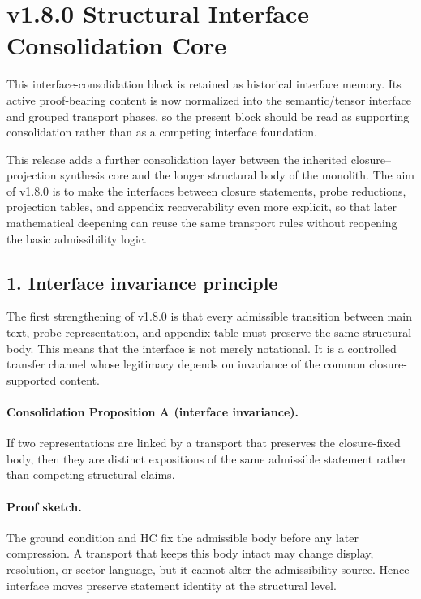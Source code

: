 \section*{v1.8.0 Structural Interface Consolidation Core}

\begin{remark}
\label{rem:normalization-note-v180}
This interface-consolidation block is retained as historical interface memory. Its active proof-bearing content is now normalized into the semantic/tensor interface and grouped transport phases, so the present block should be read as supporting consolidation rather than as a competing interface foundation.
\end{remark}

This release adds a further consolidation layer between the inherited closure--projection
synthesis core and the longer structural body of the monolith. The aim of
v1.8.0 is to make the interfaces between closure statements, probe reductions,
projection tables, and appendix recoverability even more explicit, so that later
mathematical deepening can reuse the same transport rules without reopening the
basic admissibility logic.

\subsection*{1. Interface invariance principle}
The first strengthening of v1.8.0 is that every admissible transition between
main text, probe representation, and appendix table must preserve the same
structural body. This means that the interface is not merely notational. It is a
controlled transfer channel whose legitimacy depends on invariance of the common
closure-supported content.

\paragraph{Consolidation Proposition A (interface invariance).}
If two representations are linked by a transport that preserves the closure-fixed
body, then they are distinct expositions of the same admissible statement rather
than competing structural claims.

\paragraph{Proof sketch.}
The ground condition and HC fix the admissible body before any later compression.
A transport that keeps this body intact may change display, resolution, or
sector language, but it cannot alter the admissibility source. Hence interface
moves preserve statement identity at the structural level.

